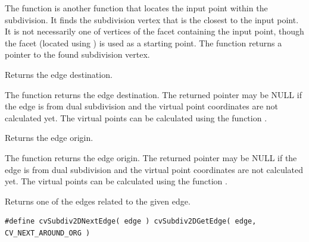 \begin{description}
\end{description}

The function is another function that
locates the input point within the subdivision. It finds the subdivision vertex that
is the closest to the input point. It is not necessarily one of vertices
of the facet containing the input point, though the facet (located using
) is used as a starting
point. The function returns a pointer to the found subdivision vertex.

Returns the edge destination.


\begin{description}
\end{description}

The function returns the edge destination. The
returned pointer may be NULL if the edge is from dual subdivision and
the virtual point coordinates are not calculated yet. The virtual points
can be calculated using the function .

Returns the edge origin.


\begin{description}
\end{description}

The function returns the edge
origin. The returned pointer may be NULL if the edge is from dual
subdivision and the virtual point coordinates are not calculated
yet. The virtual points can be calculated using the function
.

Returns one of the edges related to the given edge.

\begin{lstlisting}
#define cvSubdiv2DNextEdge( edge ) cvSubdiv2DGetEdge( edge, CV_NEXT_AROUND_ORG )
\end{lstlisting}

